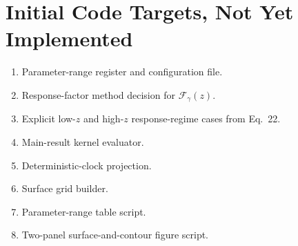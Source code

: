 \documentclass[11pt]{article}
\begin{document}
\section*{Initial Code Targets, Not Yet Implemented}
\begin{enumerate}
  \item Parameter-range register and configuration file.
  \item Response-factor method decision for \(\mathcal F_\gamma(z)\).
  \item Explicit low-\(z\) and high-\(z\) response-regime cases from Eq.~22.
  \item Main-result kernel evaluator.
  \item Deterministic-clock projection.
  \item Surface grid builder.
  \item Parameter-range table script.
  \item Two-panel surface-and-contour figure script.
\end{enumerate}
\end{document}
